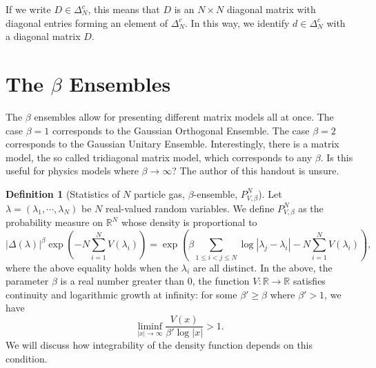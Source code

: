 \documentclass[
  twocolumn,
  landscape]{report}
\theoremstyle{definition}
\newtheorem{definition}[theorem]{Definition}
\theoremstyle{remark}
\begin{document}
If we write \(D \in \Delta_N^c\), this means that \(D\) is an
\(N \times N\) diagonal matrix with diagonal entries forming an element
of \(\Delta_N^c\). In this way, we identify \(d \in \Delta_N^c\) with a
diagonal matrix \(D\).

\section{The $\beta$ Ensembles}

The \(\beta\) ensembles allow for presenting different matrix models all
at once. The case \(\beta =1\) corresponds to the Gaussian Orthogonal
Ensemble. The case \(\beta = 2\) corresponds to the Gaussian Unitary
Ensemble. Interestingly, there is a matrix model, the so called
tridiagonal matrix model, which corresponds to any \(\beta\). Is this
useful for physics models where \(\beta \to \infty\)? The author of this
handout is unsure.

\begin{definition}[Statistics of $N$ particle gas, $\beta$-ensemble, $P_{V,\beta}^N$]
Let $\lambda = (\lambda_1, \cdots, \lambda_N)$ be $N$ real-valued random variables. 
We define $P_{V,\beta}^N$ as the probability measure on $\mathbb R^N$ whose
density is proportional to
$$
| \Delta(\lambda) |^\beta \exp \left( -N \sum_{i=1}^N V(\lambda_i) \right) = 
\exp \left( \beta \sum_{1 \le i < j \le N} \log |\lambda_j - \lambda_i| -N \sum_{i=1}^N V(\lambda_i) \right),
$$
where the above equality holds when the $\lambda_i$ are all distinct. 
In the above, the parameter $\beta$ is a real number greater than 0, 
the function $V: \mathbb R \to \mathbb R$ satisfies continuity and logarithmic growth
at infinity:
for some $\beta' \ge \beta$ where $\beta' > 1$, we have 
$$
\liminf_{|x| \to \infty} \frac{V(x)}{\beta' \log|x|} > 1. 
$$
We will discuss how integrability of the 
density function depends on this condition.
\end{definition}


\printbibliography
\end{document}
